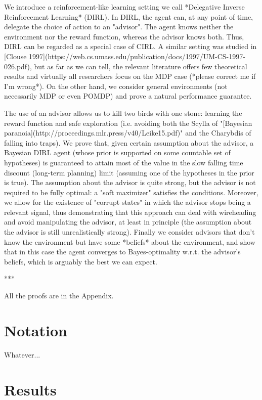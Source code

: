 \documentclass[a4paper]{article}
\begin{document}
We introduce a reinforcement-like learning setting we call *Delegative Inverse Reinforcement Learning* (DIRL). In DIRL, the agent can, at any point of time, delegate the choice of action to an "advisor". The agent knows neither the environment nor the reward function, whereas the advisor knows both. Thus, DIRL can be regarded as a special case of CIRL. A similar setting was studied in [Clouse 1997](https://web.cs.umass.edu/publication/docs/1997/UM-CS-1997-026.pdf), but as far as we can tell, the relevant literature offers few theoretical results and virtually all researchers focus on the MDP case (*please correct me if I'm wrong*). On the other hand, we consider general environments (not necessarily MDP or even POMDP) and prove a natural performance guarantee.

The use of an advisor allows us to kill two birds with one stone: learning the reward function and safe exploration (i.e. avoiding both the Scylla of "[Bayesian paranoia](http://proceedings.mlr.press/v40/Leike15.pdf)" and the Charybdis of falling into traps). We prove that, given certain assumption about the advisor, a Bayesian DIRL agent (whose prior is supported on some countable set of hypotheses) is guaranteed to attain most of the value in the slow falling time discount (long-term planning) limit (assuming one of the hypotheses in the prior is true). The assumption about the advisor is quite strong, but the advisor is not required to be fully optimal: a "soft maximizer" satisfies the conditions. Moreover, we allow for the existence of "corrupt states" in which the advisor stops being a relevant signal, thus demonstrating that this approach can deal with wireheading and avoid manipulating the advisor, at least in principle (the assumption about the advisor is still unrealistically strong). Finally we consider advisors that don't know the environment but have some *beliefs* about the environment, and show that in this case the agent converges to Bayes-optimality w.r.t. the advisor's beliefs, which is arguably the best we can expect.

***

All the proofs are in the Appendix.

\section{Notation}

Whatever...

\section{Results}
\end{document}

